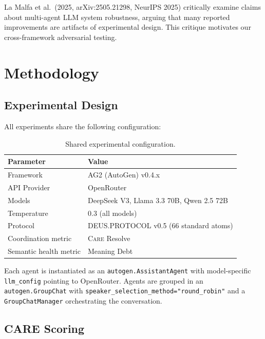 \documentclass[11pt,a4paper]{article}
\newcommand{\care}{\textsc{Care}\xspace}
\begin{document}
La Malfa et al.\ (2025, arXiv:2505.21298, NeurIPS 2025) critically
examine claims about multi-agent LLM system robustness, arguing that
many reported improvements are artifacts of experimental design.  This
critique motivates our cross-framework adversarial testing.

\section{Methodology}\label{sec:method}

\subsection{Experimental Design}

All experiments share the following configuration:

\begin{table}[H]
\centering\small
\caption{Shared experimental configuration.}\label{tab:config}
\begin{tabular}{@{}ll@{}}
\toprule
\textbf{Parameter} & \textbf{Value} \\
\midrule
Framework       & AG2 (AutoGen) v0.4.x \\
API Provider    & OpenRouter \\
Models          & DeepSeek V3, Llama 3.3 70B, Qwen 2.5 72B \\
Temperature     & 0.3 (all models) \\
Protocol        & DEUS.PROTOCOL v0.5 (66 standard atoms) \\
Coordination metric  & \care Resolve \\
Semantic health metric & Meaning Debt \\
\bottomrule
\end{tabular}
\end{table}

Each agent is instantiated as an \texttt{autogen.AssistantAgent} with
model-specific \texttt{llm\_config} pointing to OpenRouter.  Agents are
grouped in an \texttt{autogen.GroupChat} with
\texttt{speaker\_selection\_method="round\_robin"} and a
\texttt{GroupChatManager} orchestrating the conversation.

\subsection{CARE Scoring}
\end{document}
